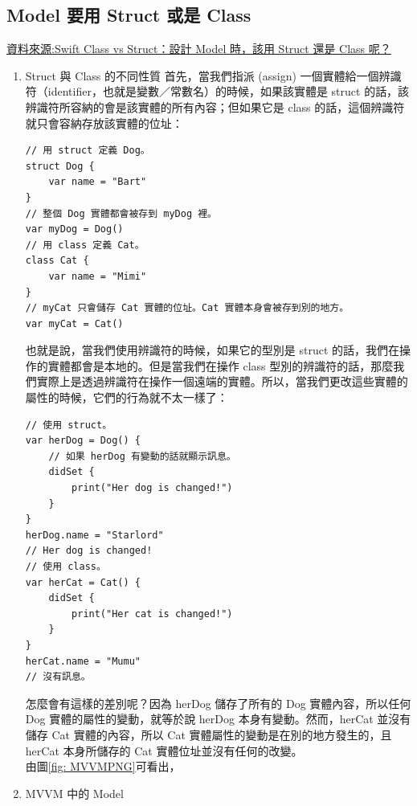 \documentclass[a4paper,12pt]{article}
\begin{document}
\subsection{Model 要用 Struct 或是 Class}
\label{sec:org7ad1a31}
\href{https://www.appcoda.com.tw/swift-class/}{資料來源:Swift Class vs Struct：設計 Model 時，該用 Struct 還是 Class 呢？}\\
\begin{enumerate}
\item Struct 與 Class 的不同性質
\label{sec:org44bee36}
首先，當我們指派 (assign) 一個實體給一個辨識符（identifier，也就是變數／常數名）的時候，如果該實體是 struct 的話，該辨識符所容納的會是該實體的所有內容；但如果它是 class 的話，這個辨識符就只會容納存放該實體的位址：\\
\lstset{breaklines=true,language=swift,label= ,caption= ,captionpos=b,firstnumber=1,numbers=left}
\begin{lstlisting}
// 用 struct 定義 Dog。
struct Dog {
    var name = "Bart"
}
// 整個 Dog 實體都會被存到 myDog 裡。
var myDog = Dog()
// 用 class 定義 Cat。
class Cat {
    var name = "Mimi"
}
// myCat 只會儲存 Cat 實體的位址。Cat 實體本身會被存到別的地方。
var myCat = Cat()
\end{lstlisting}
也就是說，當我們使用辨識符的時候，如果它的型別是 struct 的話，我們在操作的實體都會是本地的。但是當我們在操作 class 型別的辨識符的話，那麼我們實際上是透過辨識符在操作一個遠端的實體。所以，當我們更改這些實體的屬性的時候，它們的行為就不太一樣了：\\
\lstset{breaklines=true,language=swift,label= ,caption= ,captionpos=b,firstnumber=1,numbers=left}
\begin{lstlisting}
// 使用 struct。
var herDog = Dog() {
    // 如果 herDog 有變動的話就顯示訊息。
    didSet {
        print("Her dog is changed!")
    }
}
herDog.name = "Starlord"
// Her dog is changed!
// 使用 class。
var herCat = Cat() {
    didSet {
        print("Her cat is changed!")
    }
}
herCat.name = "Mumu"
// 沒有訊息。
\end{lstlisting}
怎麼會有這樣的差別呢？因為 herDog 儲存了所有的 Dog 實體內容，所以任何 Dog 實體的屬性的變動，就等於說 herDog 本身有變動。然而，herCat 並沒有儲存 Cat 實體的內容，所以 Cat 實體屬性的變動是在別的地方發生的，且 herCat 本身所儲存的 Cat 實體位址並沒有任何的改變。\\
由圖\ref{fig: MVVMPNG}可看出，\\
\item MVVM 中的 Model
\label{sec:orgb5034cf}
\end{enumerate}
\end{document}
